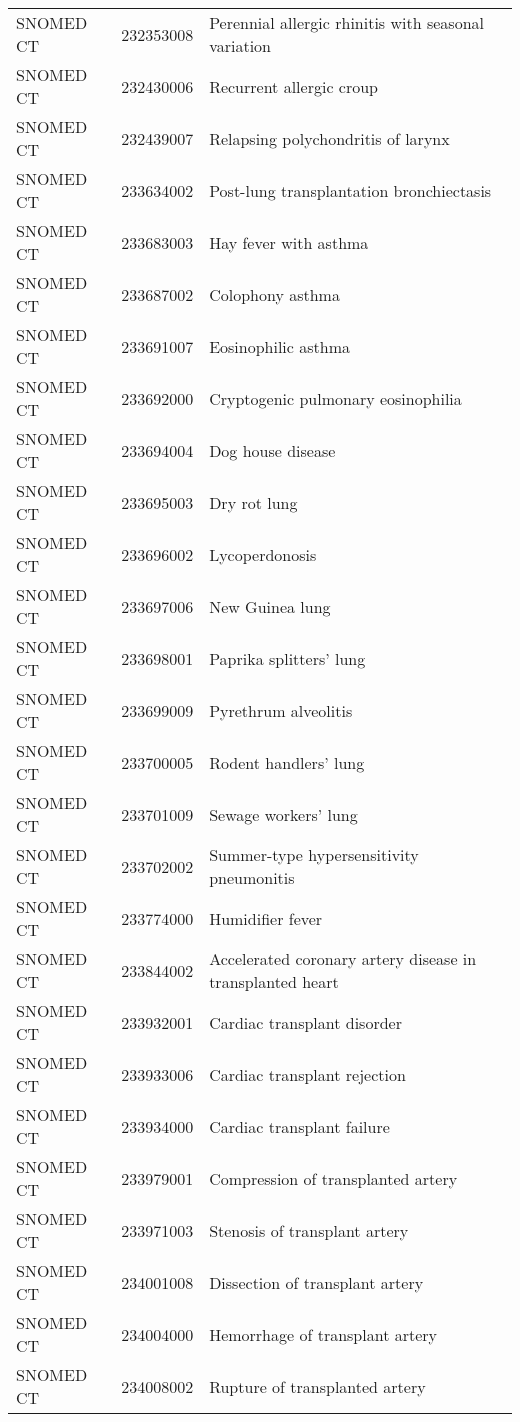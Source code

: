 \begin{longtable}{p{}p{}p{}}
  SNOMED CT & 232353008 & Perennial allergic rhinitis with seasonal variation \\ 
  SNOMED CT & 232430006 & Recurrent allergic croup \\ 
  SNOMED CT & 232439007 & Relapsing polychondritis of larynx \\ 
  SNOMED CT & 233634002 & Post-lung transplantation bronchiectasis \\ 
  SNOMED CT & 233683003 & Hay fever with asthma \\ 
  SNOMED CT & 233687002 & Colophony asthma \\ 
  SNOMED CT & 233691007 & Eosinophilic asthma \\ 
  SNOMED CT & 233692000 & Cryptogenic pulmonary eosinophilia \\ 
  SNOMED CT & 233694004 & Dog house disease \\ 
  SNOMED CT & 233695003 & Dry rot lung \\ 
  SNOMED CT & 233696002 & Lycoperdonosis \\ 
  SNOMED CT & 233697006 & New Guinea lung \\ 
  SNOMED CT & 233698001 & Paprika splitters' lung \\ 
  SNOMED CT & 233699009 & Pyrethrum alveolitis \\ 
  SNOMED CT & 233700005 & Rodent handlers' lung \\ 
  SNOMED CT & 233701009 & Sewage workers' lung \\ 
  SNOMED CT & 233702002 & Summer-type hypersensitivity pneumonitis \\ 
  SNOMED CT & 233774000 & Humidifier fever \\ 
  SNOMED CT & 233844002 & Accelerated coronary artery disease in transplanted heart \\ 
  SNOMED CT & 233932001 & Cardiac transplant disorder \\ 
  SNOMED CT & 233933006 & Cardiac transplant rejection \\ 
  SNOMED CT & 233934000 & Cardiac transplant failure \\ 
  SNOMED CT & 233979001 & Compression of transplanted artery \\ 
  SNOMED CT & 233971003 & Stenosis of transplant artery \\ 
  SNOMED CT & 234001008 & Dissection of transplant artery \\ 
  SNOMED CT & 234004000 & Hemorrhage of transplant artery \\ 
  SNOMED CT & 234008002 & Rupture of transplanted artery \\ 

\end{longtable}
